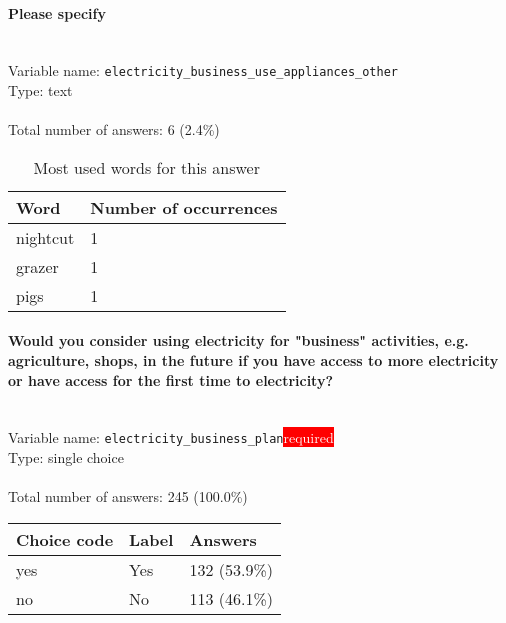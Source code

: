 \documentclass[11.5pt, a4paper]{scrartcl}
\begin{document}
\paragraph{Please specify}
\  \\Variable name: \texttt{electricity\_business\_use\_appliances\_other}\\
Type: text\\
\\Total number of answers: 6 (2.4\%)
\\[0.2em]\begin{table}[H]
 \begin{tabular}{p{4cm}|p{8cm}}
Word & Number of occurrences  \\
\hline
\cellcolor{mygray}nightcut&\cellcolor{mygray}1\\
\hline
grazer&1\\
\hline
\cellcolor{mygray}pigs&\cellcolor{mygray}1\\
\hline
\end{tabular}
\caption{\label{tab:table-name} Most used words for this answer}
\end{table}
\paragraph{Would you consider using electricity for "business" activities, e.g. agriculture, shops, in the future if you have access to more electricity or have access for the first time to electricity?}
\  \\Variable name: \texttt{electricity\_business\_plan}\hfill\colorbox{red}{\small{\textcolor{white}{required}}}\\
 Type: single choice\\
\\Total number of answers: 245 (100.0\%)
\\[0.2em] \begin{tabular}{p{4cm}|p{8cm}|p{3cm}}
Choice code & Label & Answers \\
\hline
yes & Yes& \cellcolor{color2}132 (53.9\%)\\
\cellcolor{mygray} no & \cellcolor{mygray}No & \cellcolor{color2}113 (46.1\%)\\
\end{tabular}
\end{document}
